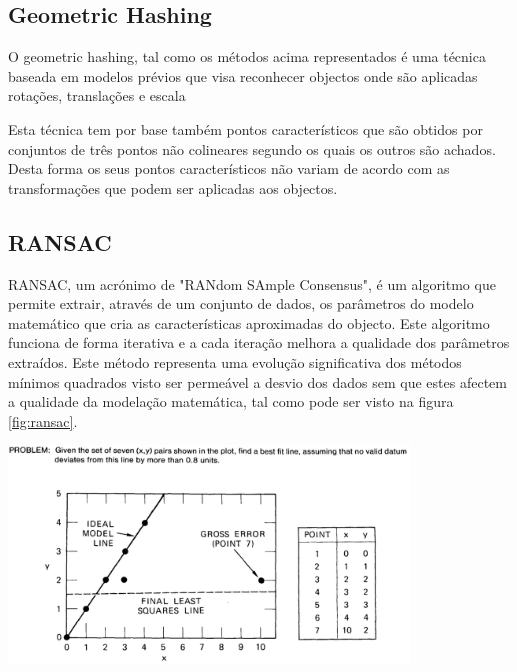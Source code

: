 \subsection{Geometric Hashing}

O geometric hashing, tal como os métodos acima representados é uma técnica baseada
em modelos prévios que visa reconhecer objectos onde são aplicadas rotações,
translações e escala \cite{1989SPIE.1095..515C}

Esta técnica tem por base também pontos característicos que são obtidos por
conjuntos de três pontos não colineares segundo os quais os outros são achados. 
Desta forma os seus pontos característicos não variam de acordo com as 
transformações que podem ser aplicadas aos objectos.



\subsection{RANSAC}

RANSAC\cite{Fischler:1981:RSC:358669.358692}, um acrónimo de "RANdom SAmple Consensus",
é um algoritmo que permite extrair, através de um conjunto de dados, os parâmetros
do modelo matemático que cria as características aproximadas do objecto. Este algoritmo 
funciona de forma iterativa e a cada iteração melhora a qualidade dos parâmetros extraídos.
Este método representa uma evolução significativa dos métodos mínimos quadrados visto ser
permeável a desvio dos dados sem que estes afectem a qualidade da modelação matemática,
tal como pode ser visto na figura \ref{fig:ransac}.

\begin{center}
	\includegraphics[width=0.80\textwidth]{figures/least_squares_shortcomings.png}
	\label{fig:ransac}
\end{center}



